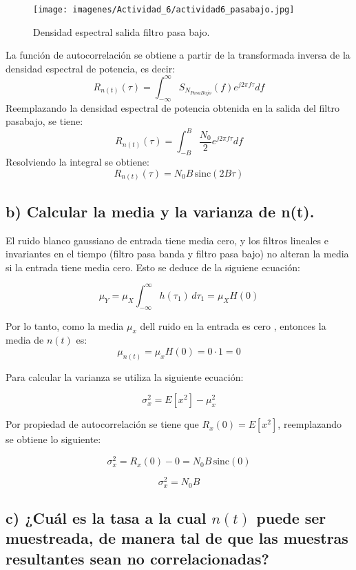 		\begin{figure}[H]
			\centering
			\texttt{[image: imagenes/Actividad\_6/actividad6\_pasabajo.jpg]}
			\caption{Densidad espectral salida filtro pasa bajo.}
			\label{fig:6pasabajo}
		\end{figure}

	La función de autocorrelación se obtiene a partir de la transformada inversa de la densidad espectral de potencia, es 
	decir:
		\[
			R_{n(t)}(\tau) = \int_{-\infty}^{\infty} S_{N_{PasaBajo}}(f) e^{j 2 \pi f \tau} df
		\]
	Reemplazando la densidad espectral de potencia obtenida en la salida del filtro pasabajo, se tiene:
		\[
			R_{n(t)}(\tau) = \int_{-B}^{B} \dfrac{N_0}{2} e^{j 2 \pi f \tau} df
		\]
	Resolviendo la integral se obtiene:
		\[
			R_{n(t)}(\tau) = N_0 B \, \text{sinc}(2 B \tau)
		\]
	

\subsection*{b) Calcular la media y la varianza de n(t).} \par

	El ruido blanco gaussiano de entrada tiene media cero, y los filtros lineales e invariantes en el tiempo (filtro pasa banda 
	y filtro pasa bajo) no alteran la media si la entrada tiene media cero. Esto se deduce de la siguiene ecuación:
	
		\[
			\mu_Y = \mu_X \int_{-\infty}^{\infty} h(\tau_1)\, d\tau_1 = \mu_X H(0)
		\]

	Por lo tanto, como la media $\mu_x$ dell ruido en la entrada es cero , entonces la media de $n(t)$ es:
		\[
			\mu_{n(t)} = \mu_x H(0) = 0 \cdot 1 = 0
		\]
	
	Para calcular la varianza se utiliza la siguiente ecuación:

		\[
		\sigma_x^2 = E[x^2] - \mu_x^2
		\]

	Por propiedad de autocorrelación se tiene que \(R_x(0) = E[x^2]\), reemplazando se obtiene lo siguiente:

		\[
		\sigma_x^2 = R_x(0) - 0 = N_0 B \, \text{sinc}(0)
		\]

		\[
		\sigma_x^2 = N_0 B
		\]


\subsection*{c) ¿Cuál es la tasa a la cual $n(t)$ puede ser muestreada, de manera tal de que las muestras resultantes sean no
 correlacionadas?} \par


